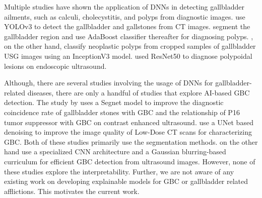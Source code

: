 %
Multiple studies have shown the application of DNNs in detecting gallbladder ailments, such as calculi, cholecystitis, and polyps from diagnostic images. \cite{gbYolo} use YOLOv3 to detect the gallbladder and gallstones from CT images. \cite{gbPolyp} segment the gallbladder region and use AdaBoost classifier thereafter for diagnosing polyps. \cite{gbPolyp2}, on the other hand, classify neoplastic polyps from cropped samples of gallbladder USG images using an InceptionV3 model. \cite{jang2021diagnostic} used ResNet50 to diagnose polypoidal lesions on endoscopic ultrasound.
\par Although, there are several studies involving the usage of DNNs for gallbladder-related diseases, there are only a handful of studies that explore AI-based GBC detection. The study by \cite{xue2021segnet} uses a Segnet model to improve the diagnostic coincidence rate of gallbladder stones with GBC and the relationship of P16 tumor suppressor with GBC on contrast enhanced ultrasound. \cite{chang2022ct} use a UNet based denoising to improve the image quality of Low-Dose CT scans for characterizing GBC. Both of these studies primarily use the segmentation methods. \cite{basu2022surpassing} on the other hand use a specialized CNN architecture and a Gaussian blurring-based curriculum for efficient GBC detection from ultrasound images. However, none of these studies explore the interpretability.  
Further, we are not aware of any existing work on developing explainable models for GBC or gallbladder related afflictions. This motivates the current work.


